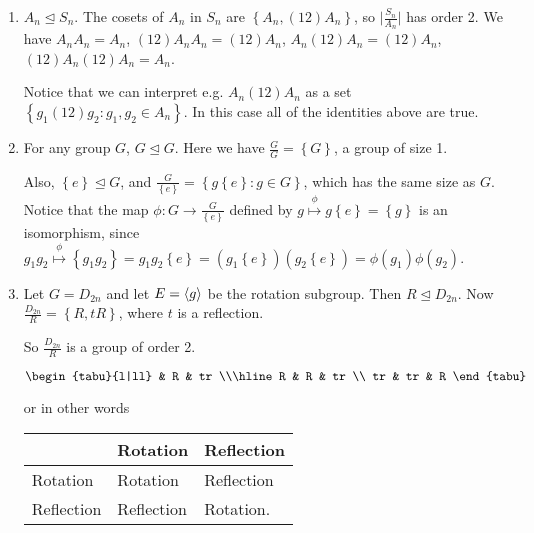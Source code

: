 \documentclass{article}
\theoremstyle{definition} \newtheorem*{definition}{Definition}
\begin{document}
\begin{exmps}\hfill \begin{enumerate} \item $A_n \trianglelefteq S_n$. The
          cosets of $A_n$ in $S_n$ are $\left\{ A_n , (12)A_n\right\}$, so
          $\big|\frac{S_n}{A_n}\big|$ has order 2. We have $A_nA_n = A_n$,
          $(12)A_nA_n=(12)A_n$, $A_n(12)A_n=(12)A_n$, $(12)A_n(12)A_n=A_n$.

      Notice that we can interpret e.g. $A_n(12)A_n$ as a set $\left\{
      g_1(12)g_2 : g_1,g_2 \in A_n \right\}$. In this case all of the
      identities above are true.

    \item For any group $G$, $G \trianglelefteq G$. Here we have
      $\frac{G}{G}=\left\{ G \right\}$, a group of size 1.

      Also, $\left\{ e \right\} \trianglelefteq G$, and $\frac{G}{\left\{ e
      \right\}}=\left\{ g\left\{ e \right\}:g \in G \right\}$, which has the
      same size as $G$. Notice that the map $\phi : G \rightarrow
      \frac{G}{\left\{ e \right\}}$ defined by $g \overset{\phi}{\mapsto}
      g\left\{ e \right\}=\left\{ g \right\}$ is an isomorphism, since $g_1g_2
      \overset{\phi}{\mapsto} \left\{ g_1g_2 \right\}=g_1g_2\left\{ e
      \right\}=(g_1\left\{ e \right\})(g_2\left\{ e
      \right\})=\phi(g_1)\phi(g_2)$. 


\newpage \item Let $G=D_{2n}$ and let $E = \langle g \rangle$ be the rotation subgroup.
  Then $R \trianglelefteq D_{2n}$. Now $\frac{D_{2n}}{R}=\left\{ R,tR
  \right\}$, where $t$ is a reflection.

      So $\frac{D_{2n}}{R}$ is a group of order 2.

      \begin{table}[h] \centering $\begin{tabu}{l|ll} & R & tr \\\hline R & R &
          tr \\ tr & tr & R \end{tabu}$ \label{tab:d2ntable} \end{table} or in
      other words

      \begin{table}[h] \centering \begin{tabular}{l|ll} & Rotation &
          Reflection\\\hline Rotation & Rotation & Reflection\\ Reflection &
          Reflection & Rotation.  \end{tabular} \label{tab:rottable}
      \end{table}


\end{enumerate}
\end{exmps}
\end{document}
